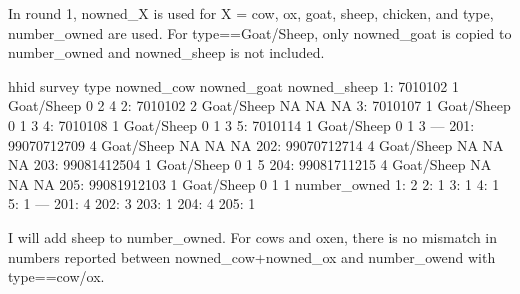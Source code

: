 In round 1, \textsf{nowned\_X} is used for X = cow, ox, goat, sheep, chicken, and \textsf{type}, \textsf{number\_owned} are used. For \textsf{type==Goat/Sheep}, only \textsf{nowned\_goat} is copied to \textsf{number\_owned} and \textsf{nowned\_sheep} is not included. 
\begin{Schunk}
\begin{Soutput}
            hhid survey       type nowned_cow nowned_goat nowned_sheep
  1:     7010102      1 Goat/Sheep          0           2            4
  2:     7010102      2 Goat/Sheep         NA          NA           NA
  3:     7010107      1 Goat/Sheep          0           1            3
  4:     7010108      1 Goat/Sheep          0           1            3
  5:     7010114      1 Goat/Sheep          0           1            3
 ---                                                                  
201: 99070712709      4 Goat/Sheep         NA          NA           NA
202: 99070712714      4 Goat/Sheep         NA          NA           NA
203: 99081412504      1 Goat/Sheep          0           1            5
204: 99081711215      4 Goat/Sheep         NA          NA           NA
205: 99081912103      1 Goat/Sheep          0           1            1
     number_owned
  1:            2
  2:            1
  3:            1
  4:            1
  5:            1
 ---             
201:            4
202:            3
203:            1
204:            4
205:            1
\end{Soutput}
\end{Schunk}
I will add sheep to \textsf{number\_owned}. For cows and oxen, there is no mismatch in numbers reported between \textsf{nowned\_cow+nowned\_ox} and \textsf{number\_owend} with \textsf{type==cow/ox}.

